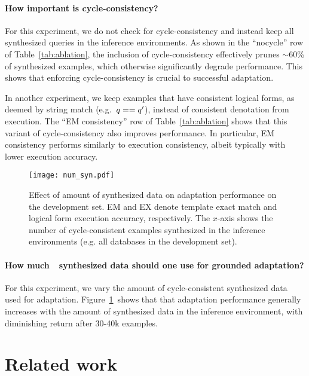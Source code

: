 \documentclass[11pt,a4paper]{article}
\begin{document}
\paragraph{How important is cycle-consistency?}
For this experiment, we do not check for cycle-consistency and instead keep all synthesized queries in the inference environments.
As shown in the ``nocycle'' row of Table~\ref{tab:ablation}, the inclusion of cycle-consistency effectively prunes $\sim$60\% of synthesized examples, which otherwise significantly degrade performance.
This shows that enforcing cycle-consistency is crucial to successful adaptation.

In another experiment, we keep examples that have consistent logical forms, as deemed by string match (e.g.~${q} == {{q}^\prime}$), instead of consistent denotation from execution.
The ``EM consistency'' row of Table~\ref{tab:ablation} shows that this variant of cycle-consistency also improves performance.
In particular, EM consistency performs similarly to execution consistency, albeit typically with lower execution accuracy.

\begin{figure}[t]
    \centering
    \texttt{[image: num\_syn.pdf]}
    \vspace{-0.2in}
    \caption{
    Effect of amount of synthesized data on adaptation performance on the development set.
    EM and EX denote template exact match and logical form execution accuracy, respectively.
    The $x$-axis shows the number of cycle-consistent examples synthesized in the inference environments (e.g. all databases in the development set).
    }
    \vspace{-0.2in}
    \label{fig:adapt_curve}
\end{figure}


\paragraph{How much~\modelnameshort~synthesized data should one use for grounded adaptation?}
For this experiment, we vary the amount of cycle-consistent synthesized data used for adaptation.
Figure~\ref{fig:adapt_curve}~shows that that adaptation performance generally increases with the amount of synthesized data in the inference environment, with diminishing return after 30-40k examples.



\section{Related work}
\end{document}

